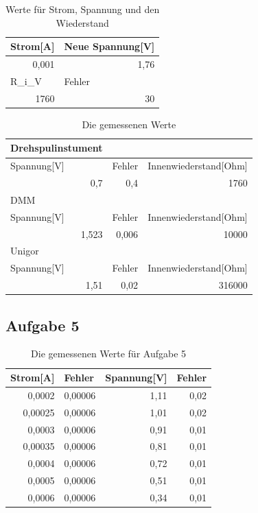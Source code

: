 \documentclass[12pt]{scrartcl}
\begin{document}
\begin{table}[htbp]
\caption{Werte für Strom, Spannung und den Wiederstand}
\begin{tabular}{|l|l|}
\hline
Strom[A] & Neue Spannung[V] \\ \hline
\multicolumn{1}{|r|}{0,001} & \multicolumn{1}{r|}{1,76} \\ \hline
R\_i\_V & Fehler \\ \hline
\multicolumn{1}{|r|}{1760} & \multicolumn{1}{r|}{30} \\ \hline
\end{tabular}
\label{aufgabe_4_werte}
\end{table}

\begin{table}[htbp]
\caption{Die gemessenen Werte}
\begin{tabular}{|l|l|l|}
\hline
Drehspulinstument &  &  \\ \hline
Spannung[V] & Fehler & Innenwiederstand[Ohm] \\ \hline
\multicolumn{1}{|r|}{0,7} & \multicolumn{1}{r|}{0,4} & \multicolumn{1}{r|}{1760} \\ \hline
DMM &  &  \\ \hline
Spannung[V] & Fehler & Innenwiederstand[Ohm] \\ \hline
\multicolumn{1}{|r|}{1,523} & \multicolumn{1}{r|}{0,006} & \multicolumn{1}{r|}{10000} \\ \hline
Unigor &  &  \\ \hline
Spannung[V] & Fehler & Innenwiederstand[Ohm] \\ \hline
\multicolumn{1}{|r|}{1,51} & \multicolumn{1}{r|}{0,02} & \multicolumn{1}{r|}{316000} \\ \hline
\end{tabular}
\label{aufgabe_4_messwerte}
\end{table}

\newpage

\subsection{Aufgabe 5}

\begin{table}[htbp]
\caption{Die gemessenen Werte für Aufgabe 5}
\begin{tabular}{|r|r|r|r|}
\hline
\multicolumn{1}{|l|}{Strom[A]} & \multicolumn{1}{l|}{Fehler} & \multicolumn{1}{l|}{Spannung[V]} & \multicolumn{1}{l|}{Fehler} \\ \hline
0,0002 & 0,00006 & 1,11 & 0,02 \\ \hline
0,00025 & 0,00006 & 1,01 & 0,02 \\ \hline
0,0003 & 0,00006 & 0,91 & 0,01 \\ \hline
0,00035 & 0,00006 & 0,81 & 0,01 \\ \hline
0,0004 & 0,00006 & 0,72 & 0,01 \\ \hline
0,0005 & 0,00006 & 0,51 & 0,01 \\ \hline
0,0006 & 0,00006 & 0,34 & 0,01 \\ \hline
\end{tabular}
\label{aufgabe_5_messwerte}
\end{table}
\end{document}
